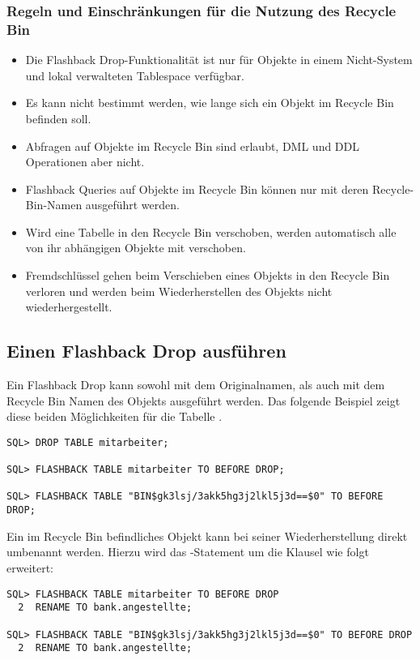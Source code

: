         \subsubsection{Regeln und Einschr\"ankungen f\"ur die Nutzung des Recycle Bin}
          \begin{itemize}
            \item Die Flashback Drop-Funktionalit\"at ist nur f\"ur Objekte in einem Nicht-System und lokal verwalteten Tablespace verf\"ugbar.
            \item Es kann nicht bestimmt werden, wie lange sich ein Objekt im Recycle Bin befinden soll.
            \item Abfragen auf Objekte im Recycle Bin sind erlaubt, DML und DDL Operationen aber nicht.
            \item Flashback Queries auf Objekte im Recycle Bin k\"onnen nur mit deren Recycle-Bin-Namen ausgef\"uhrt werden.
            \item Wird eine Tabelle in den Recycle Bin verschoben, werden automatisch alle von ihr abh\"angigen Objekte mit verschoben.
            \item Fremdschl\"ussel gehen beim Verschieben eines Objekts in den Recycle Bin verloren und werden beim Wiederherstellen des Objekts nicht wiederhergestellt.
          \end{itemize}
      \subsection{Einen Flashback Drop ausf\"uhren}
        Ein Flashback Drop kann sowohl mit dem Originalnamen, als auch mit dem Recycle Bin Namen des Objekts ausgef\"uhrt werden. Das folgende Beispiel zeigt diese beiden M\"oglichkeiten f\"ur die Tabelle .
\clearpage
        \begin{lstlisting}[caption={Ausf\"uhren eines Flashback Drop},label=admin1723,language=oracle_sql]
SQL> DROP TABLE mitarbeiter;

SQL> FLASHBACK TABLE mitarbeiter TO BEFORE DROP;

SQL> FLASHBACK TABLE "BIN$gk3lsj/3akk5hg3j2lkl5j3d==$0" TO BEFORE DROP;
        \end{lstlisting}
        Ein im Recycle Bin befindliches Objekt kann bei seiner Wiederherstellung direkt umbenannt werden. Hierzu wird das -Statement um die Klausel  wie folgt erweitert:
        \begin{lstlisting}[caption={Ausf\"uhren eines Flashback Drop mit gleichzeitiger Umbenennung},label=admin1724,language=oracle_sql]
SQL> FLASHBACK TABLE mitarbeiter TO BEFORE DROP
  2  RENAME TO bank.angestellte;

SQL> FLASHBACK TABLE "BIN$gk3lsj/3akk5hg3j2lkl5j3d==$0" TO BEFORE DROP
  2  RENAME TO bank.angestellte;
        \end{lstlisting}
